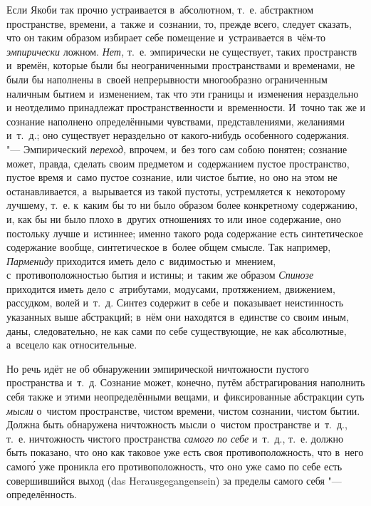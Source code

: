 Если Якоби так прочно устраивается в~абсолютном, т.~е. абстрактном
пространстве, времени, а~также и~сознании, то, прежде всего, следует сказать,
что он таким образом избирает себе помещение и~устраивается в~чём-то
{\em эмпирически} ложном. {\em Нет,} т.~е. эмпирически не существует, таких
пространств и~времён, которые были бы неограниченными пространствами и
временами, не были бы наполнены в~своей непрерывности многообразно ограниченным
наличным бытием и~изменением, так что эти границы и~изменения нераздельно и
неотделимо принадлежат пространственности и~временности. И~точно так же и
сознание наполнено определёнными чувствами, представлениями, желаниями и~т.~д.;
оно существует нераздельно от какого-нибудь особенного содержания. "---
Эмпирический {\em переход,} впрочем, и~без того сам собою понятен; сознание
может, правда, сделать своим предметом и~содержанием пустое пространство,
пустое время и~само пустое сознание, или чистое бытие, но оно на этом не
останавливается, а~вырывается из такой пустоты, устремляется к~некоторому
лучшему, т.~е. к~каким бы то ни было образом более конкретному содержанию, и,
как бы ни было плохо в~других отношениях то или иное содержание, оно постольку
лучше и~истиннее; именно такого рода содержание есть синтетическое содержание
вообще, синтетическое в~более общем смысле. Так например, {\em Пармениду}
приходится иметь дело с~видимостью и~мнением, с~противоположностью бытия и
истины; и~таким же образом {\em Спинозе} приходится иметь дело с~атрибутами,
модусами, протяжением, движением, рассудком, волей и~т.~д. Синтез содержит в
себе и~показывает неистинность указанных выше абстракций; в~нём они находятся
в~единстве со своим иным, даны, следовательно, не как сами по себе
существующие, не как абсолютные, а~всецело как относительные.

Но речь идёт не об обнаружении эмпирической ничтожности пустого пространства
и~т.~д. Сознание может, конечно, путём абстрагирования наполнить себя также и
этими неопределёнными вещами, и~фиксированные абстракции суть {\em мысли} о~чистом
пространстве, чистом времени, чистом сознании, чистом бытии. Должна быть
обнаружена ничтожность мысли о~чистом пространстве и~т.~д., т.~е. ничтожность чистого
пространства {\em самого по себе} и~т.~д., т.~е. должно быть показано,
что оно как таковое уже есть своя противоположность, что в~него самог\'{о}
уже проникла его противоположность, что оно уже само по себе есть совершившийся
выход (das Heraus\-ge\-gan\-gen\-sein) за пределы самого себя "--- определённость.

